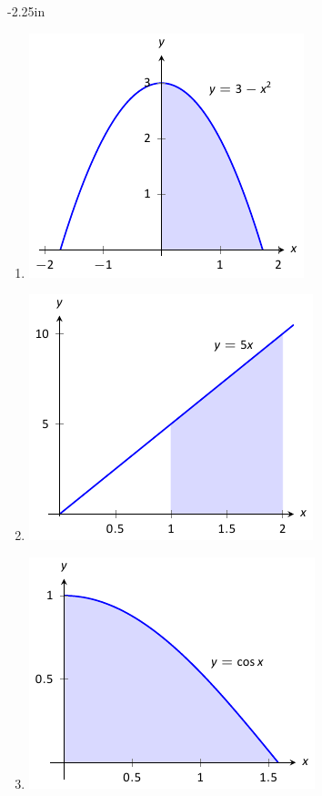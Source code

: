 \begin{adjustwidth*}{}{-2.25in}
\begin{multicols*}{2}
\begin{enumerate}[1),resume]
\item \begin{minipage}{\linewidth}\centering\includegraphics{figures/fig07_02_ex_09}\end{minipage}
\item \begin{minipage}{\linewidth}\centering\includegraphics{figures/fig07_02_ex_06}\end{minipage}
\item \begin{minipage}{\linewidth}\centering\includegraphics{figures/fig07_02_ex_07}\end{minipage}

\end{enumerate}
\end{multicols*}
\end{adjustwidth*}
